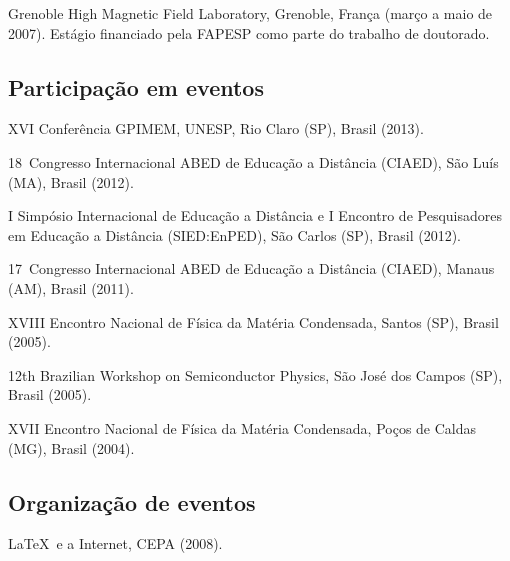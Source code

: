 \begin{compactitem}
  \item Grenoble High Magnetic Field Laboratory, Grenoble, França (março a maio de 2007). Estágio financiado pela FAPESP como parte do trabalho de doutorado.
\end{compactitem}

\subsection{Participação em eventos}

\begin{compactitem}
  \item XVI Conferência GPIMEM, UNESP, Rio Claro (SP), Brasil (2013).
  \item 18\textordmasculine\ Congresso Internacional ABED de Educação a Distância (CIAED), São Luís (MA), Brasil (2012).
  \item I Simpósio Internacional de Educação a Distância e I Encontro de Pesquisadores em Educação a Distância (SIED:EnPED), São Carlos (SP), Brasil (2012).
  \item 17\textordmasculine\ Congresso Internacional ABED de Educação a Distância (CIAED), Manaus (AM), Brasil (2011).
  \item XVIII Encontro Nacional de Física da Matéria Condensada, Santos (SP), Brasil (2005).
  \item 12th Brazilian Workshop on Semiconductor Physics, São José dos Campos (SP), Brasil (2005).
  \item XVII Encontro Nacional de Física da Matéria Condensada, Poços de Caldas (MG), Brasil (2004).
\end{compactitem}

\subsection{Organização de eventos}

\begin{compactitem}
  \item \LaTeX\ e a Internet, CEPA (2008).
\end{compactitem}

